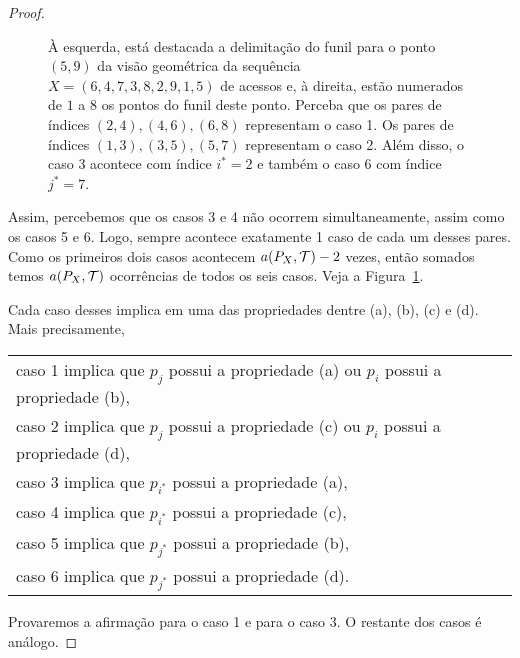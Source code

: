\begin{proof}
\begin{figure}
        \caption{À esquerda, está destacada a delimitação do funil para o ponto $(5,9)$ da visão geométrica da sequência $X = (6,4,7,3,8,2,9,1,5)$ de acessos e, à direita, estão numerados de $1$ a $8$ os pontos do funil deste ponto. Perceba que os pares de índices $(2,4),(4,6),(6,8)$ representam o caso 1. Os pares de índices $(1,3),(3,5),(5,7)$ representam o caso 2. Além disso, o caso 3 acontece com índice $i^{*} = 2$ e também o caso 6 com índice $j^{*} = 7$.}
    \label{fig:espelhamento-de-funil-inicial}
    \end{figure}

    Assim, percebemos que os casos 3 e 4 não ocorrem simultaneamente, assim como os casos 5 e 6. Logo, sempre acontece exatamente 1 caso de cada um desses pares. Como os primeiros dois casos acontecem $a(P_X,\mathcal{T}) - 2$ vezes, então somados temos $a(P_X,\mathcal{T})$ ocorrências de todos os seis casos. Veja a Figura~\ref{fig:espelhamento-de-funil-inicial}.

    Cada caso desses implica em uma das propriedades dentre (a), (b), (c) e (d). Mais precisamente,

    
    \begin{tabular}{l}
        caso 1 implica que $p_j$ possui a propriedade (a) ou $p_i$ possui a propriedade (b),\\
        caso 2 implica que $p_j$ possui a propriedade (c) ou $p_i$ possui a propriedade (d),\\
        caso 3 implica que $p_{i^{*}}$ possui a propriedade (a),\\
        caso 4 implica que $p_{i^{*}}$ possui a propriedade (c),\\
        caso 5 implica que $p_{j^{*}}$ possui a propriedade (b),\\
        caso 6 implica que $p_{j^{*}}$ possui a propriedade (d).
    \end{tabular}
    
    Provaremos a afirmação para o caso 1 e para o caso 3. O restante dos casos é análogo.


\end{proof}
